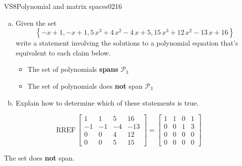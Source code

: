\begin{exercise}{VS8}{Polynomial and matrix spaces}{0216} 
\begin{exerciseStatement} 

\begin{enumerate}[(a)]
\item  

 Given the set \[\left\{ -x + 1 , -x + 1 , 5 \, x^{3} + 4 \, x^{2} - 4 \, x + 5 , 15 \, x^{3} + 12 \, x^{2} - 13 \, x + 16 \right\}\] write a statement involving the solutions to a polynomial equation that's equivalent to each claim below. 

 

\begin{itemize}
\item  

 The set of polynomials \textbf{spans} \(\mathcal{P}_3\) 

 
\item  

 The set of polynomials does \textbf{not} span \(\mathcal{P}_3\) 

 
\end{itemize}

     
\item  

 Explain how to determine which of these statements is true. 

 
\end{enumerate}

     \end{exerciseStatement}
 \begin{exerciseAnswer} 

 \[
\mathrm{RREF}\, \left[\begin{array}{cccc}
1 & 1 & 5 & 16 \\
-1 & -1 & -4 & -13 \\
0 & 0 & 4 & 12 \\
0 & 0 & 5 & 15
\end{array}\right] = \left[\begin{array}{cccc}
1 & 1 & 0 & 1 \\
0 & 0 & 1 & 3 \\
0 & 0 & 0 & 0 \\
0 & 0 & 0 & 0
\end{array}\right]
            \] 

 

 The set does \textbf{not} span. 

 \end{exerciseAnswer}
 \end{exercise}



